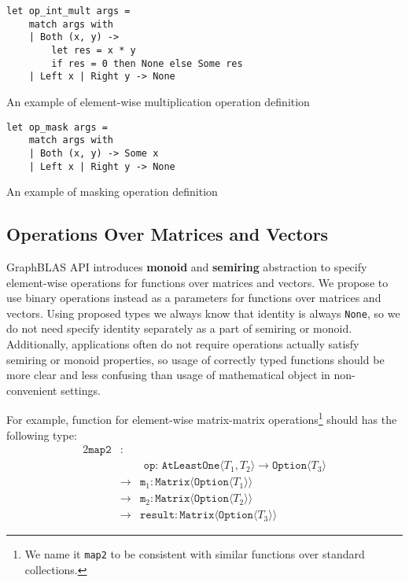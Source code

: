 \begin{listing}[h]
    \begin{verbatim}
let op_int_mult args =
    match args with
    | Both (x, y) -> 
        let res = x * y 
        if res = 0 then None else Some res 
    | Left x | Right y -> None
    \end{verbatim}
    \caption{An example of element-wise multiplication operation definition}
    \label{lst:opIntMult}
\end{listing}

\begin{listing}[h]
    \begin{verbatim}
let op_mask args =
    match args with
    | Both (x, y) -> Some x
    | Left x | Right y -> None
    \end{verbatim}
    \caption{An example of masking operation definition}
    \label{lst:opMask}
\end{listing}

\subsection{Operations Over Matrices and Vectors}

GraphBLAS API introduces \textbf{monoid} and \textbf{semiring} abstraction to specify element-wise operations for functions over matrices and vectors.
We propose to use binary operations instead as a parameters for functions over matrices and vectors. 
Using proposed types we always know that identity is always \texttt{None}, so we do not need specify identity separately as a part of semiring or monoid.
Additionally, applications often do not require operations actually satisfy semiring or monoid properties, so usage of correctly typed functions should be more clear and less confusing than usage of mathematical object in non-convenient settings.

For example, function for element-wise matrix-matrix operations\footnote{We name it \texttt{map2} to be consistent with similar functions over standard collections.} should has the following type:
\begin{alignat*}{2}
    \texttt{map2} & : & \\ 
        &   & \texttt{ op: AtLeastOne} \langle T_1, T_2 \rangle \to \texttt{Option} \langle T_3 \rangle \\
        & \to & \texttt{m}_1: \texttt{Matrix} \langle \texttt{Option} \langle T_1\rangle \rangle \\
        & \to & \texttt{m}_2: \texttt{Matrix} \langle \texttt{Option} \langle T_2 \rangle \rangle \\
        & \to & \texttt{result}: \texttt{Matrix} \langle \texttt{Option} \langle T_3\rangle \rangle
\end{alignat*}

